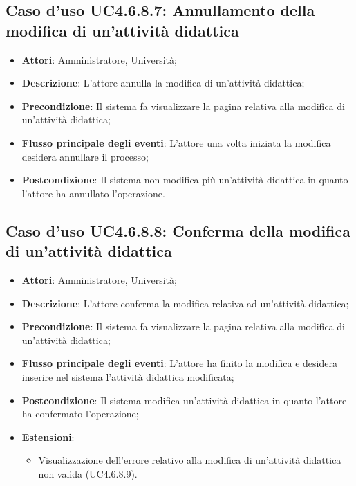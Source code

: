 \subsection{Caso d'uso \texorpdfstring{UC4.6.8.7}{UC4.6.8.7}: Annullamento della modifica di un'attività didattica}
\begin{itemize}
	\item \textbf{Attori}: Amministratore, Università;
	\item \textbf{Descrizione}: L'attore annulla la modifica di un'attività didattica;
	
	\item \textbf{Precondizione}: Il sistema fa visualizzare la pagina relativa alla modifica di un'attività didattica;
	
	\item \textbf{Flusso principale degli eventi}: L'attore una volta iniziata la modifica desidera annullare il processo;
	
	\item \textbf{Postcondizione}: Il sistema non modifica più un'attività didattica in quanto l'attore ha annullato l'operazione.
	
\end{itemize}
\subsection{Caso d'uso \texorpdfstring{UC4.6.8.8}{UC4.6.8.8}: Conferma della modifica di un'attività didattica}
\begin{itemize}
	\item \textbf{Attori}: Amministratore, Università;
	\item \textbf{Descrizione}: L'attore conferma la modifica relativa ad un'attività didattica;
	
	\item \textbf{Precondizione}: Il sistema fa visualizzare la pagina relativa alla modifica di un'attività didattica;
	
	
	\item \textbf{Flusso principale degli eventi}: L'attore ha finito la modifica e desidera inserire nel sistema l'attività didattica modificata;
	
	\item \textbf{Postcondizione}: Il sistema modifica un'attività didattica in quanto l'attore ha confermato l'operazione;
	
	
	\item \textbf{Estensioni}:
	\begin{itemize}
		\item Visualizzazione dell'errore relativo alla modifica di un’attività didattica non valida (UC4.6.8.9).
	\end{itemize}
\end{itemize}
